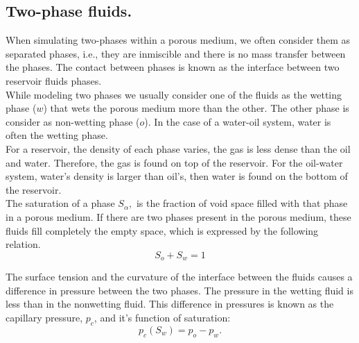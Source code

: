 \documentclass[12pt]{report}
\begin{document}
\subsection{Two-phase fluids.}
When simulating two-phases within a porous medium, we often consider them as separated phases, i.e.,
they are inmiscible and there is no mass transfer between the phases. 
The contact between phases is known as the interface between two reservoir fluids phases.\\ 
While modeling two phases we 
usually consider one of the fluids as the wetting phase ($w$) that wets the porous medium more than the other.
The other phase is consider as non-wetting phase ($o$). In the case of a water-oil system, water is often 
the wetting phase. \\
For a reservoir, the density of each phase varies, the gas is less dense than the oil and water. 
Therefore, the gas is found on top of the reservoir. For the oil-water system, water's density is larger 
than oil's, then water is found on the bottom of the reservoir.\\
The saturation of a phase $S_{\alpha},$ is the fraction of void space filled with that phase in a porous 
medium.
If there are two phases present in the porous medium, these fluids fill completely the empty space, which is
expressed by the following relation.
\begin{equation}\label{eq:satrel}
 S_o+S_w=1
\end{equation}

The surface tension and the curvature of the interface between the fluids causes a difference in pressure
between the two phases. 
The pressure in the wetting fluid is less than in the nonwetting fluid. 
This difference in pressures is known as the capillary pressure, $p_c$, and it's function of saturation:
\begin{equation}\label{eq:cappress}
 p_c(S_w)=p_o-p_w.
\end{equation}
\end{document}
